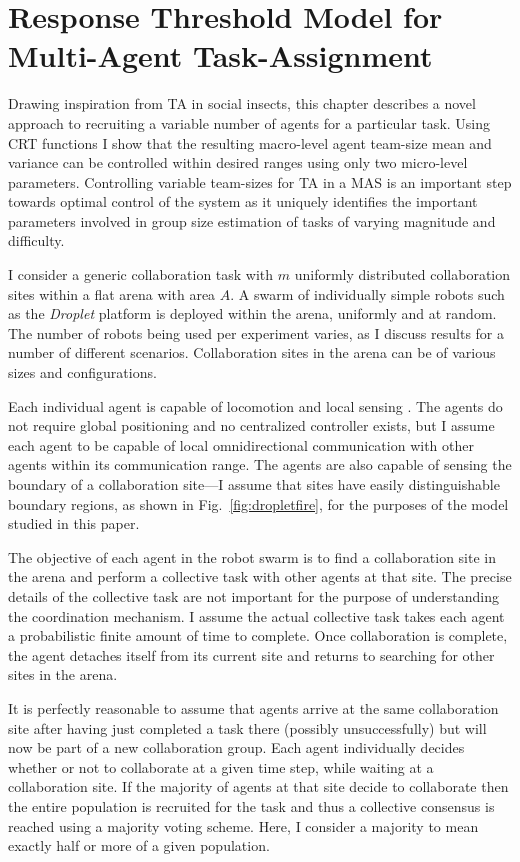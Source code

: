 \documentclass[defaultstyle,12pt]{thesis}
\begin{document}
\chapter{Response Threshold Model for Multi-Agent Task-Assignment}\label{ch:resthmodel}
Drawing inspiration from TA in social insects, this chapter describes a novel approach to recruiting a variable number of agents for a particular task. Using CRT functions I show that the resulting macro-level agent team-size mean and variance can be controlled within desired ranges using only two micro-level parameters. Controlling variable team-sizes for TA in a MAS is an important step towards optimal control of the system as it uniquely identifies the important parameters involved in group size estimation of tasks of varying magnitude and difficulty. 

I consider a generic collaboration task with $m$ uniformly distributed collaboration sites within a flat arena with area $A$. A swarm of individually simple robots such as the \emph{Droplet} platform \cite{Farrow2014,Klingner2014} is deployed within the arena, uniformly and at random. The number of robots being used per experiment varies, as I discuss results for a number of different scenarios. Collaboration sites in the arena can be of various sizes and configurations.

Each individual agent is capable of locomotion \cite{Klingner2014} and local sensing \cite{Farrow2014}. The agents do not require global positioning and no centralized controller exists, but I assume each agent to be capable of local omnidirectional communication with other agents within its communication range. The agents are also capable of sensing the boundary of a collaboration site---I assume that sites have easily distinguishable boundary regions, as shown in Fig.~\ref{fig:dropletfire}, for the purposes of the model studied in this paper. 

The objective of each agent in the robot swarm is to find a collaboration site in the arena and perform a collective task with other agents at that site. The precise details of the collective task are not important for the purpose of understanding the coordination mechanism. I assume the actual collective task takes each agent a probabilistic finite amount of time to complete. Once collaboration is complete, the agent detaches itself from its current site and returns to searching for other sites in the arena. 

It is perfectly reasonable to assume that agents arrive at the same collaboration site after having just completed a task there (possibly unsuccessfully) but will now be part of a new collaboration group. Each agent individually decides whether or not to collaborate at a given time step, while waiting at a collaboration site. If the majority of agents at that site decide to collaborate then the entire population is recruited for the task and thus a collective consensus is reached using a majority voting scheme. Here, I consider a majority to mean exactly half or more of a given population. 
\end{document}
